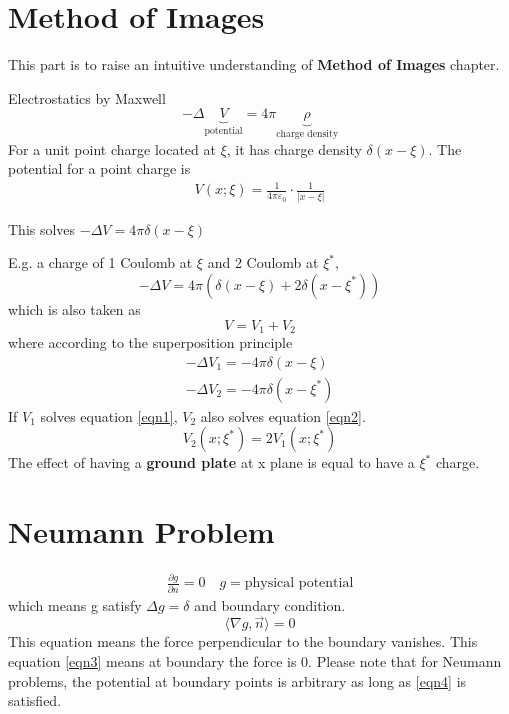 \documentclass{article}
\newcommand{\Sangle}[1]{\langle {#1} \rangle}
\numberwithin{equation}{section}
\newcommand{\<}{\langle}
\begin{document}
\section{Method of Images}
\begin{tcolorbox}[colback=green!10!white]
This part is to raise an intuitive understanding of \textbf{Method of Images} chapter.
\end{tcolorbox}
Electrostatics by Maxwell
\[
	- \Delta \underbrace{V}_{\text{potential}} = 4 \pi \underbrace{\rho}_{\text{charge density}}
\]
For a unit point charge located at $\xi$, it has charge density $\delta(x- \xi)$. The potential for a point charge is
\begin{align*}
	V(x;\xi) = \frac{1}{4 \pi \varepsilon_0}\cdot  \frac{1}{|x-\xi|}
\end{align*}

This solves $-\Delta V = 4 \pi \delta(x-\xi)$

\begin{tcolorbox}[colback = blue!10!white]
E.g. a charge of 1 Coulomb at $\xi$ and 2 Coulomb at $\xi^*$,
\[
	- \Delta V = 4 \pi (\delta(x- \xi)+ 2 \delta(x- \xi^*))
\]
which is also taken as 
\[
	V = V_1 + V_2
\]
where according to the superposition principle
\begin{align}
	- \Delta V_1 = - 4 \pi \delta(x- \xi) \label{eqn1} \\
	- \Delta V_2 = - 4 \pi \delta(x- \xi^*) \label{eqn2} 
\end{align}
If $V_1$ solves equation \eqref{eqn1}, $V_2$ also solves equation \eqref{eqn2}. 
\[
	V_2(x; \xi^*) = 2 V_1(x;\xi^*)
\]
The effect of having a \textbf{ground plate} at x plane is equal to have a $\xi^*$ charge.
\end{tcolorbox}
\section{Neumann Problem}
\begin{align}
	\frac{\partial g}{\partial n} = 0 \quad g = \text{physical potential} \label{eqn4}
\end{align}
which means g satisfy $\Delta g = \delta$ and boundary condition.
\begin{equation}	
	\Sangle{\nabla g, \vec{n}} = 0 \label{eqn3}
\end{equation}
This equation means the force perpendicular to the boundary vanishes. This equation \eqref{eqn3} means at boundary the force is 0. Please note that for Neumann problems, the potential at boundary points is arbitrary as long as \eqref{eqn4} is satisfied.
\end{document}
